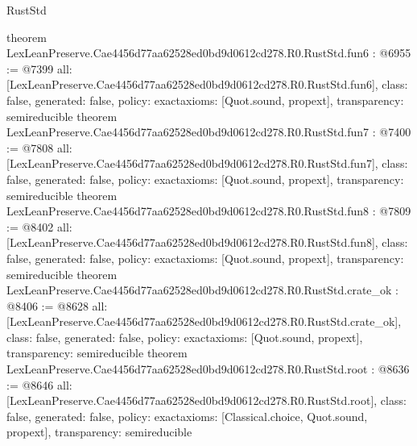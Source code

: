 \begin{lexlean}{RustStd}
\begin{coremodule}
{}
theorem LexLeanPreserve.Cae4456d77aa62528ed0bd9d0612cd278.R0.RustStd.fun6 : @6955 := @7399 {
  all: [LexLeanPreserve.Cae4456d77aa62528ed0bd9d0612cd278.R0.RustStd.fun6],
  class: false,
  generated: false,
  policy: exact{axioms: [Quot.sound, propext]},
  transparency: semireducible
}
theorem LexLeanPreserve.Cae4456d77aa62528ed0bd9d0612cd278.R0.RustStd.fun7 : @7400 := @7808 {
  all: [LexLeanPreserve.Cae4456d77aa62528ed0bd9d0612cd278.R0.RustStd.fun7],
  class: false,
  generated: false,
  policy: exact{axioms: [Quot.sound, propext]},
  transparency: semireducible
}
theorem LexLeanPreserve.Cae4456d77aa62528ed0bd9d0612cd278.R0.RustStd.fun8 : @7809 := @8402 {
  all: [LexLeanPreserve.Cae4456d77aa62528ed0bd9d0612cd278.R0.RustStd.fun8],
  class: false,
  generated: false,
  policy: exact{axioms: [Quot.sound, propext]},
  transparency: semireducible
}
theorem LexLeanPreserve.Cae4456d77aa62528ed0bd9d0612cd278.R0.RustStd.crate_ok : @8406 := @8628 {
  all: [LexLeanPreserve.Cae4456d77aa62528ed0bd9d0612cd278.R0.RustStd.crate_ok],
  class: false,
  generated: false,
  policy: exact{axioms: [Quot.sound, propext]},
  transparency: semireducible
}
theorem LexLeanPreserve.Cae4456d77aa62528ed0bd9d0612cd278.R0.RustStd.root : @8636 := @8646 {
  all: [LexLeanPreserve.Cae4456d77aa62528ed0bd9d0612cd278.R0.RustStd.root],
  class: false,
  generated: false,
  policy: exact{axioms: [Classical.choice, Quot.sound, propext]},
  transparency: semireducible
}


\end{coremodule}
\end{lexlean}
